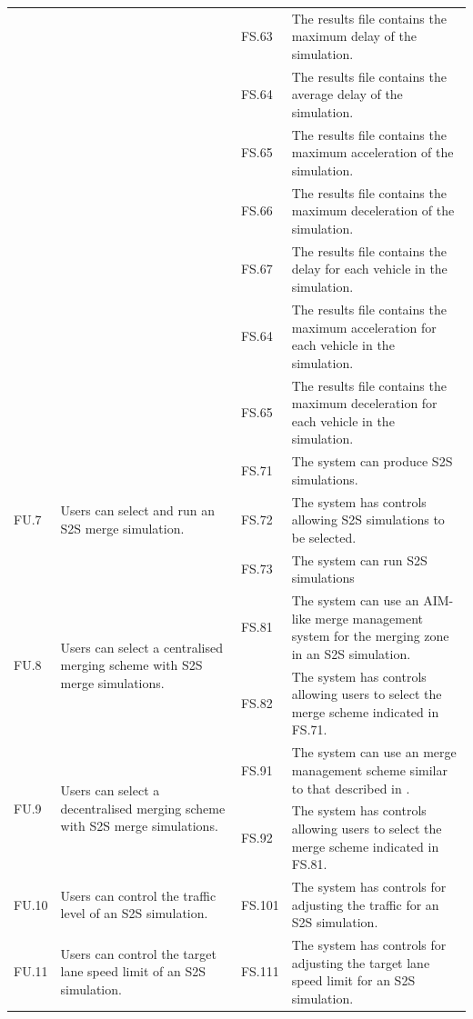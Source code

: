 \begin{longtable}{|p{0.1\linewidth}|p{0.4\linewidth}|p{0.1\linewidth}|p{0.4\linewidth}|}
 &  & FS.63 & The results file contains the maximum delay of the simulation. \\
 &  & FS.64 & The results file contains the average delay of the simulation. \\
 &  & FS.65 & The results file contains the maximum acceleration of the simulation. \\
 &  & FS.66 & The results file contains the maximum deceleration of the simulation. \\
 &  & FS.67 & The results file contains the delay for each vehicle in the simulation. \\
 &  & FS.64 & The results file contains the maximum acceleration for each vehicle in the simulation. \\
 &  & FS.65 & The results file contains the maximum deceleration for each vehicle in the simulation. \\ 
\hline
\multirow{3}{*}{FU.7} & \multirow{3}{*}{\parbox{\linewidth}{Users can select and run an S2S merge simulation.}}
 & FS.71 & The system can produce S2S simulations. \\
 &  & FS.72 & The system has controls allowing S2S simulations to be selected. \\
 &  & FS.73 & The system can run S2S simulations \\ 
\hline
\multirow{2}{*}{FU.8} & \multirow{2}{*}{\parbox{\linewidth}{Users can select a centralised merging scheme with S2S merge simulations.}}
 & FS.81 & The system can use an AIM-like merge management system for the merging zone in an S2S simulation. \\
 &  & FS.82 & The system has controls allowing users to select the merge scheme indicated in FS.71. \\ 
\hline
\multirow{2}{*}{FU.9} & \multirow{2}{*}{\parbox{\linewidth}{Users can select a decentralised merging scheme with S2S merge simulations.}}
 & FS.91 & The system can use an merge management scheme similar to that described in \citep{VanMiddlesworth2008}. \\
 &  & FS.92 & The system has controls allowing users to select the merge scheme indicated in FS.81. \\ 
\hline
FU.10 & Users can control the traffic level of an S2S simulation. & FS.101 & The system has controls for adjusting the traffic for an S2S simulation. \\ 
\hline
FU.11 & Users can control the target lane speed limit of an S2S simulation. & FS.111 & The system has controls for adjusting the target lane speed limit for an S2S simulation. \\ 

\end{longtable}
